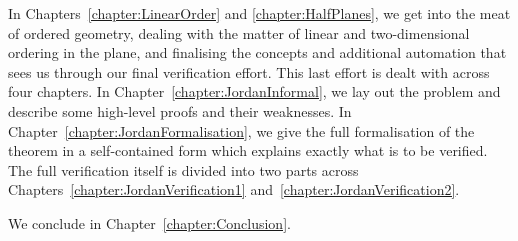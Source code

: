 In Chapters~\ref{chapter:LinearOrder} and \ref{chapter:HalfPlanes}, we get into the meat of ordered geometry, dealing with the matter of linear and two-dimensional ordering in the plane, and finalising the concepts and additional automation that sees us through our final verification effort. This last effort is dealt with across four chapters. In Chapter~\ref{chapter:JordanInformal}, we lay out the problem and describe some high-level proofs and their weaknesses. In Chapter~\ref{chapter:JordanFormalisation}, we give the full formalisation of the theorem in a self-contained form which explains exactly what is to be verified. The full verification itself is divided into two parts across Chapters~\ref{chapter:JordanVerification1} and~\ref{chapter:JordanVerification2}.

We conclude in Chapter~\ref{chapter:Conclusion}. 


